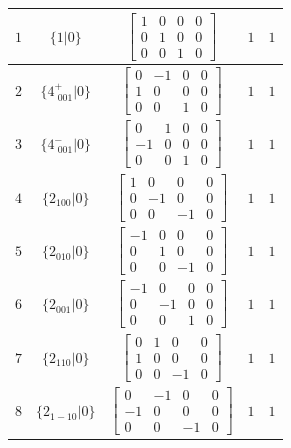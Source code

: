 \documentclass[fleqn,8pt]{jsarticle}
\begin{document}
\begin{longtable}{ccccc}
$ 1 $ & $ \{1|0\} $ & $ \begin{bmatrix} 1 & 0 & 0 & 0 \\ 0 & 1 & 0 & 0 \\ 0 & 0 & 1 & 0 \end{bmatrix} $ & $ 1 $ & $ 1 $ \\ \hline
$ 2 $ & $ \{4^{+}_{\,\,001}|0\} $ & $ \begin{bmatrix} 0 & -1 & 0 & 0 \\ 1 & 0 & 0 & 0 \\ 0 & 0 & 1 & 0 \end{bmatrix} $ & $ 1 $ & $ 1 $ \\ \hline
$ 3 $ & $ \{4^{-}_{\,\,001}|0\} $ & $ \begin{bmatrix} 0 & 1 & 0 & 0 \\ -1 & 0 & 0 & 0 \\ 0 & 0 & 1 & 0 \end{bmatrix} $ & $ 1 $ & $ 1 $ \\ \hline
$ 4 $ & $ \{2{}_{100}|0\} $ & $ \begin{bmatrix} 1 & 0 & 0 & 0 \\ 0 & -1 & 0 & 0 \\ 0 & 0 & -1 & 0 \end{bmatrix} $ & $ 1 $ & $ 1 $ \\ \hline
$ 5 $ & $ \{2{}_{010}|0\} $ & $ \begin{bmatrix} -1 & 0 & 0 & 0 \\ 0 & 1 & 0 & 0 \\ 0 & 0 & -1 & 0 \end{bmatrix} $ & $ 1 $ & $ 1 $ \\ \hline
$ 6 $ & $ \{2{}_{001}|0\} $ & $ \begin{bmatrix} -1 & 0 & 0 & 0 \\ 0 & -1 & 0 & 0 \\ 0 & 0 & 1 & 0 \end{bmatrix} $ & $ 1 $ & $ 1 $ \\ \hline
$ 7 $ & $ \{2{}_{110}|0\} $ & $ \begin{bmatrix} 0 & 1 & 0 & 0 \\ 1 & 0 & 0 & 0 \\ 0 & 0 & -1 & 0 \end{bmatrix} $ & $ 1 $ & $ 1 $ \\ \hline
$ 8 $ & $ \{2{}_{1-10}|0\} $ & $ \begin{bmatrix} 0 & -1 & 0 & 0 \\ -1 & 0 & 0 & 0 \\ 0 & 0 & -1 & 0 \end{bmatrix} $ & $ 1 $ & $ 1 $ \\ \hline

\end{longtable}
\end{document}
